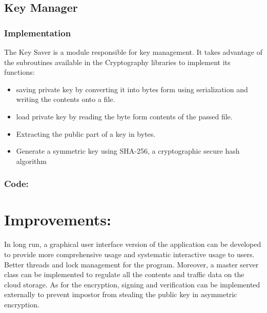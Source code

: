 \documentclass[12pt]{article}
\begin{document}
\subsection*{Key Manager}
\subsubsection*{Implementation}
The Key Saver is a module responsible for key management. It takes advantage of the subroutines available in the Cryptography libraries to implement its functions:
\begin{itemize}
\item saving private key by converting it into bytes form using serialization and writing the contents onto a file.
\item load private key by reading the byte form contents of the passed file.
\item Extracting the public part of a key in bytes.
\item Generate a symmetric key using SHA-256, a cryptographic secure hash algorithm 
\end{itemize}
\vspace*{10mm}
\subsubsection*{Code:}
 
\vspace*{30mm}
\section*{Improvements:}
In long run, a graphical user interface version of the application can be developed to provide more comprehensive usage and systematic interactive usage to users. Better threads and lock management for the program. Moreover, a master server class can be implemented to regulate all the  contents and traffic data on the cloud storage. As for the encryption, signing and verification can be implemented externally to prevent impostor from stealing the public key in asymmetric encryption. 
\end{document}
